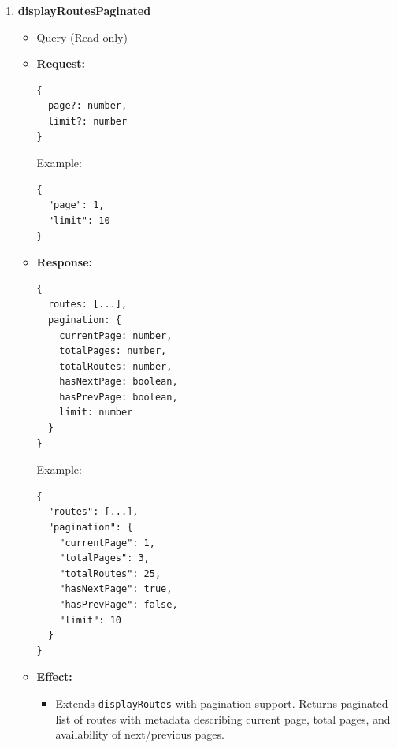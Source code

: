 \documentclass[a4paper,12pt]{article}
\begin{document}
\begin{enumerate}
  \item \textbf{displayRoutesPaginated}
    \begin{itemize}
      \item Query (Read-only)
      \item \textbf{Request:}
      \begin{verbatim}
{
  page?: number,
  limit?: number
}
      \end{verbatim}
      Example:
      \begin{verbatim}
{
  "page": 1,
  "limit": 10
}
      \end{verbatim}
      \item \textbf{Response:}
      \begin{verbatim}
{
  routes: [...],
  pagination: {
    currentPage: number,
    totalPages: number,
    totalRoutes: number,
    hasNextPage: boolean,
    hasPrevPage: boolean,
    limit: number
  }
}
      \end{verbatim}
      Example:
      \begin{verbatim}
{
  "routes": [...],
  "pagination": {
    "currentPage": 1,
    "totalPages": 3,
    "totalRoutes": 25,
    "hasNextPage": true,
    "hasPrevPage": false,
    "limit": 10
  }
}
      \end{verbatim}
      \item \textbf{Effect:}
      \begin{itemize}
        \item Extends \texttt{displayRoutes} with pagination support. Returns paginated list of routes with metadata describing current page, total pages, and availability of next/previous pages.
      \end{itemize}
    \end{itemize}


\end{enumerate}
\end{document}
